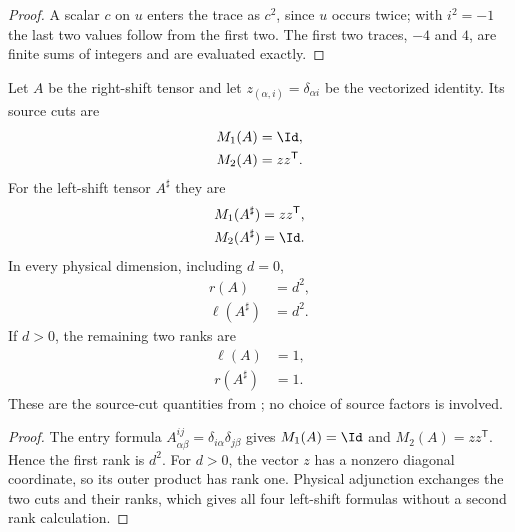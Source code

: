 \begin{proof}\leanok
    A scalar $c$ on $u$ enters the trace as $c^2$, since $u$ occurs twice;
    with $i^2=-1$ the last two values follow from the first two. The first
    two traces, $-4$ and $4$, are finite sums of integers and are evaluated
    exactly.
\end{proof}

\begin{lemma}
    \label{thm:mpu_shift_source_cuts_ranks}
    \leanok
    Let $A$ be the right-shift tensor and let
    $z_{(\alpha,i)}=\delta_{\alpha i}$ be the vectorized identity. Its
    source cuts are
    \begin{align}
        M_1(A) & =\Id,            \\
        M_2(A) & =zz^{\mathsf T}.
    \end{align}
    For the left-shift tensor $A^\sharp$ they are
    \begin{align}
        M_1(A^\sharp) & =zz^{\mathsf T}, \\
        M_2(A^\sharp) & =\Id.
    \end{align}
    In every physical dimension, including $d=0$,
    \begin{align}
        r(A)           & =d^2, \\
        \ell(A^\sharp) & =d^2.
    \end{align}
    If $d>0$, the remaining two ranks are
    \begin{align}
        \ell(A)     & =1, \\
        r(A^\sharp) & =1.
    \end{align}
    These are the source-cut quantities from
    \cite[Section~III]{Cirac2017MPU}; no choice of source factors is involved.
\end{lemma}

\begin{proof}\leanok
    The entry formula $A^{ij}_{\alpha\beta}
        =\delta_{i\alpha}\delta_{j\beta}$ gives $M_1(A)=\Id$ and
    $M_2(A)=zz^{\mathsf T}$. Hence the first rank is $d^2$. For $d>0$, the
    vector $z$ has a nonzero diagonal coordinate, so its outer product has
    rank one. Physical adjunction exchanges the two cuts and their ranks,
    which gives all four left-shift formulas without a second rank
    calculation.
\end{proof}

